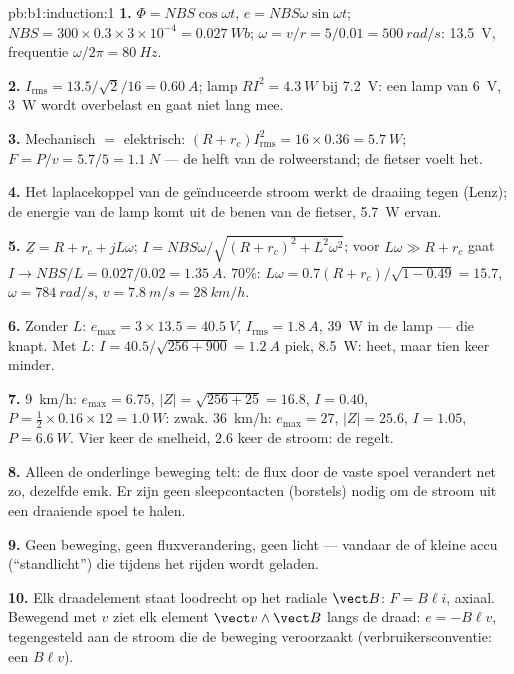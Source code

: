 \begin{solution}{pb:b1:induction:1}
\textbf{1.} $\Phi = NBS\cos\omega t$, $e = NBS\omega\sin\omega t$; $NBS = 300 \times
0.3 \times 3 \times 10^{-4} = \qty{0.027}{Wb}$; $\omega = v/r = 5/0.01 = \qty{500}{rad/s}$:
 \qty{13.5}{V}, frequentie $\omega/2\pi = \qty{80}{Hz}$.

\textbf{2.} $I_{\text{rms}} = 13.5/\sqrt2/16 = \qty{0.60}{A}$; lamp $RI^2 = \qty{4.3}{W}$
bij \qty{7.2}{V}: een lamp van \qty{6}{V}, \qty{3}{W} wordt overbelast en gaat niet
lang mee.

\textbf{3.} Mechanisch $=$ elektrisch: $(R + r_c)I_{\text{rms}}^2 = 16 \times 0.36 =
\qty{5.7}{W}$; $F = P/v = 5.7/5 = \qty{1.1}{N}$ --- de helft van de rolweerstand;
de fietser voelt het.

\textbf{4.} Het laplacekoppel van de geïnduceerde stroom werkt de draaiing tegen
(Lenz); de energie van de lamp komt uit de benen van de fietser, \qty{5.7}{W} ervan.

\textbf{5.} $\underline Z = R + r_c + jL\omega$; $I = NBS\omega/\sqrt{(R + r_c)^2 + L^2\omega^2}$;
voor $L\omega \gg R + r_c$ gaat $I \to NBS/L = 0.027/0.02 = \qty{1.35}{A}$. $70\%$: $L\omega
= 0.7(R + r_c)/\sqrt{1 - 0.49} = 15.7$, $\omega = \qty{784}{rad/s}$, $v = \qty{7.8}{m/s}
= \qty{28}{km/h}$.

\textbf{6.} Zonder $L$: $e_{\max} = 3 \times 13.5 = \qty{40.5}{V}$, $I_{\text{rms}} =
\qty{1.8}{A}$, \qty{39}{W} in de lamp --- die knapt. Met $L$: $I = 40.5/\sqrt{256 +
900} = \qty{1.2}{A}$ piek, \qty{8.5}{W}: heet, maar tien keer minder.

\textbf{7.} \qty{9}{km/h}: $e_{\max} = 6.75$, $|Z| = \sqrt{256 + 25} = 16.8$, $I = 0.40$,
$P = \tfrac12 \times 0.16 \times 12 = \qty{1.0}{W}$: zwak. \qty{36}{km/h}: $e_{\max} = 27$,
$|Z| = 25.6$, $I = 1.05$, $P = \qty{6.6}{W}$. Vier keer de snelheid, $2.6$ keer
de stroom: de  regelt.

\textbf{8.} Alleen de onderlinge beweging telt: de flux door de vaste
spoel verandert net zo, dezelfde emk. Er zijn geen sleepcontacten (borstels)
nodig om de stroom uit een draaiende spoel te halen.

\textbf{9.} Geen beweging, geen fluxverandering, geen licht --- vandaar de  of
kleine accu (``standlicht'') die tijdens het rijden wordt geladen.

\textbf{10.} Elk draadelement staat loodrecht op het radiale $\vect B$:
$F = B\ell i$, axiaal. Bewegend met $v$ ziet elk element $\vect v\wedge\vect B$
langs de draad: $e = -B\ell v$, tegengesteld aan de stroom die de
beweging veroorzaakt (verbruikersconventie: een  $B\ell v$).


\end{solution}
